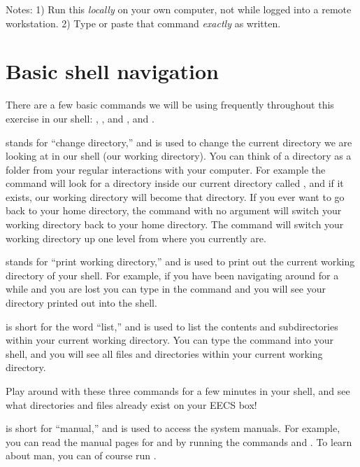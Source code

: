 \documentclass{tufte-handout}
\begin{document}
Notes: 1) Run this \emph{locally} on your own computer, not while logged
into a remote workstation. 2) Type or paste that command \emph{exactly}
as written.

\section{Basic shell navigation}

There are a few basic commands we will be using frequently throughout
this exercise in our shell: , , and
, and .

 stands for ``change directory,'' and is used to change the
current directory we are looking at in our shell (our working
directory). You can think of a directory as a folder from your regular
interactions with your computer. For example the command   will look for a
directory inside our current directory called , and
if it exists, our working directory will become that
 directory. If you ever want to go back to your home
directory, the command  with no argument will switch your
working directory back to your home directory. The command  will switch your working directory up one level from where you
currently are.

 stands for ``print working directory,'' and is used to
print out the current working directory of your shell. For example, if
you have been navigating around for a while and you are lost you can
type in the command  and you will see your directory
printed out into the shell.

 is short for the word ``list,'' and is used to list the contents
and subdirectories within your current working directory. You can type
the command  into your shell, and you will see all files and
directories within your current working directory.

Play around with these three commands for a few minutes in your shell,
and see what directories and files already exist on your EECS box!

 is short for ``manual,'' and is used to access the system
manuals. For example, you can read the manual pages for 
and  by running the commands  and
. To learn about
man, you can of course run .
\end{document}
